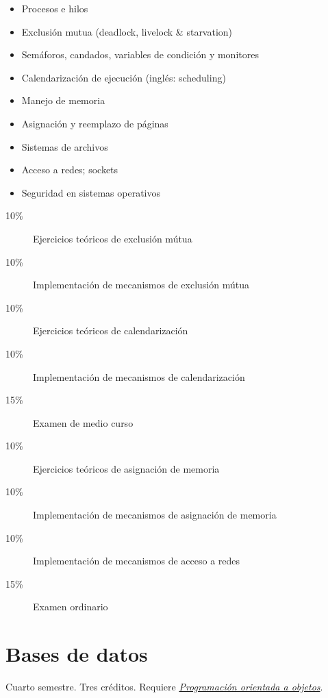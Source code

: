 \documentclass{article}
\begin{document}
\begin{multicols}{4}
\begin{itemize}
\item{Procesos e hilos}
\item{Exclusi\'{o}n mutua (deadlock, livelock \& starvation)}
\item{Sem\'{a}foros, candados, variables de condici\'{o}n y monitores}
\item{Calendarizaci\'{o}n de ejecuci\'{o}n (ingl\'{e}s: scheduling)}
\item{Manejo de memoria}
\item{Asignaci\'{o}n y reemplazo de p\'{a}ginas}
\item{Sistemas de archivos}
\item{Acceso a redes; sockets}
\item{Seguridad en sistemas operativos}
\end{itemize}

\begin{description}
\item[10\%]{Ejercicios te\'{o}ricos de exclusi\'{o}n m\'{u}tua}
\item[10\%]{Implementaci\'{o}n de mecanismos de exclusi\'{o}n m\'{u}tua}
\item[10\%]{Ejercicios te\'{o}ricos de calendarizaci\'{o}n}
\item[10\%]{Implementaci\'{o}n de mecanismos de calendarizaci\'{o}n}    
\item[15\%]{Examen de medio curso}
\item[10\%]{Ejercicios te\'{o}ricos de asignaci\'{o}n de memoria}
\item[10\%]{Implementaci\'{o}n de mecanismos de asignaci\'{o}n de memoria}
\item[10\%]{Implementaci\'{o}n de mecanismos de acceso a redes}
\item[15\%]{Examen ordinario}
\end{description}  

\vfill\null \columnbreak

\hypertarget{bdd}{\section*{Bases de datos}}    

Cuarto semestre. Tres cr\'{e}ditos. Requiere \hyperlink{poao}{\em
  Programaci\'{o}n orientada a objetos}.


\end{multicols}
\end{document}
